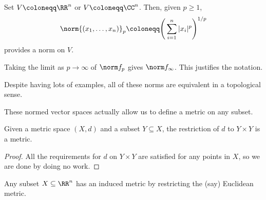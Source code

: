 \documentclass[../notes.tex]{subfiles}
\begin{document}
\begin{example} \label{ex:pnormonr}
	Set $V\coloneqq\RR^n$ or $V\coloneqq\CC^n$. Then, given $p\ge1$,
	\[\norm{(x_1,\ldots,x_n)}_p\coloneqq\Bigg(\sum_{i=1}^n|x_i|^p\Bigg)^{1/p}\]
	provides a norm on $V$.
\end{example}
\begin{remark}
	Taking the limit as $p\to\infty$ of $\norm f_p$ gives $\norm f_\infty$. This justifies the notation.
\end{remark}
\begin{remark}
	Despite having lots of examples, all of these norms are equivalent in a topological sense.
\end{remark}
These normed vector spaces actually allow us to define a metric on any subset.
\begin{proposition}
	Given a metric space $(X,d)$ and a subset $Y\subseteq X$, the restriction of $d$ to $Y\times Y$ is a metric.
\end{proposition}
\begin{proof}
	All the requirements for $d$ on $Y\times Y$ are satisfied for any points in $X$, so we are done by doing no work.
\end{proof}
\begin{example}
	Any subset $X\subseteq\RR^n$ has an induced metric by restricting the (say) Euclidean metric.
\end{example}
\end{document}
